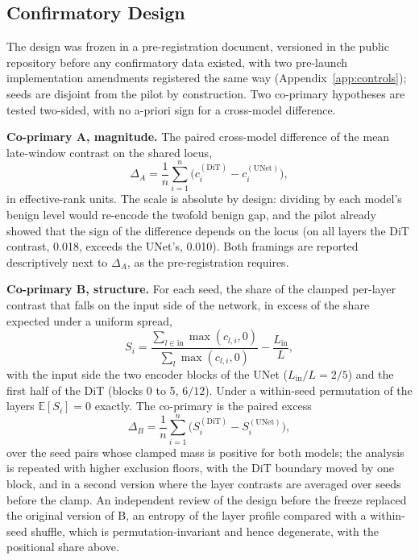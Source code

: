 \documentclass{article}
\begin{document}
\subsection{Confirmatory Design}\label{sec:design}

The design was frozen in a pre-registration document, versioned in the public repository before any confirmatory data existed, with two pre-launch implementation amendments registered the same way (Appendix~\ref{app:controls}); seeds are disjoint from the pilot by construction. Two co-primary hypotheses are tested two-sided, with no a-priori sign for a cross-model difference.

\textbf{Co-primary A, magnitude.} The paired cross-model difference of the mean late-window contrast on the shared locus,
\begin{equation}\label{eq:delta-a}
  \Delta_A = \frac{1}{n} \sum_{i=1}^{n} \bigl( c_i^{(\mathrm{DiT})} - c_i^{(\mathrm{UNet})} \bigr),
\end{equation}
in effective-rank units. The scale is absolute by design: dividing by each model's benign level would re-encode the twofold benign gap, and the pilot already showed that the sign of the difference depends on the locus (on all layers the DiT contrast, 0.018, exceeds the UNet's, 0.010). Both framings are reported descriptively next to $\Delta_A$, as the pre-registration requires.

\textbf{Co-primary B, structure.} For each seed, the share of the clamped per-layer contrast that falls on the input side of the network, in excess of the share expected under a uniform spread,
\begin{equation}\label{eq:share}
  S_i = \frac{\sum_{l \in \mathrm{in}} \max(c_{l,i}, 0)}{\sum_{l} \max(c_{l,i}, 0)} - \frac{L_{\mathrm{in}}}{L},
\end{equation}
with the input side the two encoder blocks of the UNet ($L_{\mathrm{in}}/L = 2/5$) and the first half of the DiT (blocks 0 to 5, $6/12$). Under a within-seed permutation of the layers $\mathbb{E}[S_i] = 0$ exactly. The co-primary is the paired excess
\begin{equation}\label{eq:delta-b}
  \Delta_B = \frac{1}{n} \sum_{i=1}^{n} \bigl( S_i^{(\mathrm{DiT})} - S_i^{(\mathrm{UNet})} \bigr),
\end{equation}
over the seed pairs whose clamped mass is positive for both models; the analysis is repeated with higher exclusion floors, with the DiT boundary moved by one block, and in a second version where the layer contrasts are averaged over seeds before the clamp. An independent review of the design before the freeze replaced the original version of B, an entropy of the layer profile compared with a within-seed shuffle, which is permutation-invariant and hence degenerate, with the positional share above.
\end{document}
